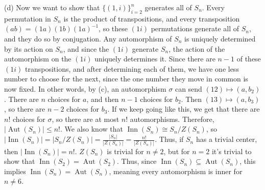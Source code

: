 \documentclass[fleqn]{article}
\DeclareMathOperator{\Aut}{Aut}
\DeclareMathOperator{\Inn}{Inn}
\begin{document}
        (d) Now we want to show that $\{(1, i)\}_{i = 2}^n$ generates all of $S_n$.  Every permutation in $S_n$ is the product of transpositions, and every transposition $(ab) = (1a)(1b)(1a)^{-1}$, so these $(1i)$ permutations generate all of $S_n$, and they do so by conjugation.  Any automorphism of $S_n$ is uniquely determined by its action on $S_n$, and since the $(1 i)$ generate $S_n$, the action of the automorphism on the $(1 i)$ uniquely determines it.  Since there are $n - 1$ of these $(1 i)$ transpositions, and after determining each of them, we have one less number to choose for the next, since the one number they move in common is now fixed.  In other words, by (c), an automorphism $\sigma$ can send $(1 2) \mapsto (a, b_2)$.  There are $n$ choices for $a$, and then $n - 1$ choices for $b_2$.  Then $(1 3) \mapsto (a, b_3)$, so there are $n - 2$ choices for $b_3$.  If we keep going like this, we get that there are $n!$ choices for $\sigma$, so there are at most $n!$ automorphisms.  Therefore, $|\Aut(S_n)| \leq n!$.  We also know that $\Inn(S_n) \cong S_n/Z(S_n)$, so $|\Inn(S_n)| = |S_n/Z(S_n)| = \frac{|S_n|}{|Z(S_n)|} = \frac{n!}{|Z(S_n)|}$.  Thus, if $S_n$ has a trivial center, then $|\Inn(S_n)| = n!$.  $Z(S_n)$ is trivial for $n \neq 2$, but for $n = 2$ it's trivial to show that $\Inn(S_2) = \Aut(S_2)$.  Thus, since $\Inn(S_n) \subseteq \Aut(S_n)$, this implies $\Inn(S_n) = \Aut(S_n)$, meaning every automorphism is inner for $n \neq 6$.
    
\end{document}
